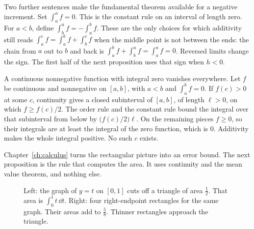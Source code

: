 Two further sentences make the fundamental theorem available for a negative increment. Set $\int_a^a f=0$. This is the constant rule on an interval of length zero. For $a<b$, define $\int_b^a f=-\int_a^b f$. These are the only choices for which additivity still reads $\int_a^c f=\int_a^b f+\int_b^c f$ when the middle point is not between the ends: the chain from $a$ out to $b$ and back is $\int_a^b f+\int_b^a f=\int_a^a f=0$. Reversed limits change the sign. The first half of the next proposition uses that sign when $h<0$.

A continuous nonnegative function with integral zero vanishes everywhere. Let $f$ be continuous and nonnegative on $[a,b]$, with $a<b$ and $\int_a^b f=0$. If $f(c)>0$ at some $c$, continuity gives a closed subinterval of $[a,b]$, of length $\ell>0$, on which $f\ge f(c)/2$. The order rule and the constant rule bound the integral over that subinterval from below by $\bigl(f(c)/2\bigr)\ell$. On the remaining pieces $f\ge 0$, so their integrals are at least the integral of the zero function, which is $0$. Additivity makes the whole integral positive. No such $c$ exists.

Chapter~\ref{ch:calculus} turns the rectangular picture into an error bound. The next proposition is the rule that computes the area. It uses continuity and the mean value theorem, and nothing else.

\begin{figure}[ht]
\centering
{}
\caption{Left: the graph of $y=t$ on $[0,1]$ cuts off a triangle of area $\frac12$. That area is $\int_0^1 t\,\dd t$. Right: four right-endpoint rectangles for the same graph. Their areas add to $\frac58$. Thinner rectangles approach the triangle.}
\label{fig:area}
\end{figure}

